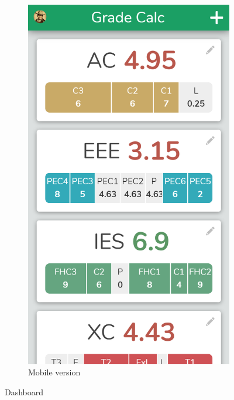 \begin{figure}[ht!]
\begin{subfigure}[b]{0.243\textwidth-0.1cm}
        \includegraphics[width=\textwidth]{media/screenshots/screenshot-home.png}
        \caption{Mobile version}
    \end{subfigure}
    \caption{Dashboard}
    \label{fig:dashboard}
\end{figure}
\vfill

\clearpage\newpage


